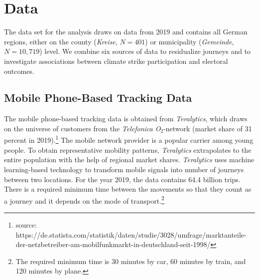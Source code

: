 \restoregeometry


















\newpage
\section{Data}\label{sec_greta_cons:data} 
The data set for the analysis draws on data from 2019 and contains all German regions, either on the county (\textit{Kreise}, $N=401$) or municipality (\textit{Gemeinde}, $N=10,719$) level. We combine six sources of data to residualize journeys and to investigate associations between climate strike participation and electoral outcomes.




\subsection{Mobile Phone-Based Tracking Data}
The mobile phone-based tracking data is obtained from \textit{Teralytics}, which draws on the universe of customers from the \textit{Telefonica O$_2$}-network (market share of 31 percent in 2019).\footnote{source: https://de.statista.com/statistik/daten/studie/3028/umfrage/marktanteile-der-netzbetreiber-am-mobilfunkmarkt-in-deutschland-seit-1998/} The mobile network provider is a popular carrier among young people. To obtain representative mobility patterns, \textit{Teralytics} extrapolates to the entire population with the help of regional market shares. \textit{Teralytics} uses machine learning-based technology to transform mobile signals into number of journeys between two locations. For the year 2019, the data contains 64.4 billion trips. There is a required minimum time between the movements so that they count as a journey and it depends on the mode of transport.\footnote{The required minimum time is 30 minutes by car, 60 minutes by train, and 120 minutes by plane.} 

